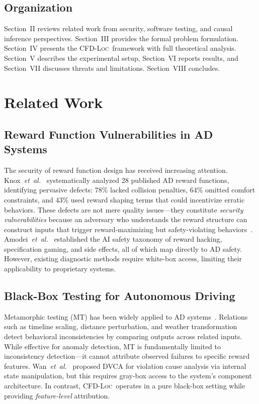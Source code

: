 \documentclass[journal]{IEEEtran}
\theoremstyle{plain}
\theoremstyle{definition}
\theoremstyle{remark}
\newcommand{\methodname}{\textsc{CFD-Loc}}
\begin{document}
\subsection{Organization}

Section~II reviews related work from security, software testing, and causal inference perspectives. Section~III provides the formal problem formulation. Section~IV presents the \methodname\ framework with full theoretical analysis. Section~V describes the experimental setup, Section~VI reports results, and Section~VII discusses threats and limitations. Section~VIII concludes.

\section{Related Work}
\label{sec:related}

\subsection{Reward Function Vulnerabilities in AD Systems}

The security of reward function design has received increasing attention. Knox~\emph{et~al.}~\cite{knox2023reward} systematically analyzed 28 published AD reward functions, identifying pervasive defects: 78\% lacked collision penalties, 64\% omitted comfort constraints, and 43\% used reward shaping terms that could incentivize erratic behaviors. These defects are not mere quality issues---they constitute \emph{security vulnerabilities} because an adversary who understands the reward structure can construct inputs that trigger reward-maximizing but safety-violating behaviors~\cite{white2023adversarial}. Amodei~\emph{et~al.}~\cite{amodei2016specification} established the AI safety taxonomy of reward hacking, specification gaming, and side effects, all of which map directly to AD safety. However, existing diagnostic methods require white-box access, limiting their applicability to proprietary systems.

\subsection{Black-Box Testing for Autonomous Driving}

Metamorphic testing (MT) has been widely applied to AD systems~\cite{deng2023rmt}. Relations such as timeline scaling, distance perturbation, and weather transformation detect behavioral inconsistencies by comparing outputs across related inputs. While effective for anomaly detection, MT is fundamentally limited to inconsistency detection---it cannot attribute observed failures to specific reward features. Wan~\emph{et~al.}~\cite{wan2024dvca} proposed DVCA for violation cause analysis via internal state manipulation, but this requires gray-box access to the system's component architecture. In contrast, \methodname\ operates in a pure black-box setting while providing \emph{feature-level} attribution.
\end{document}
